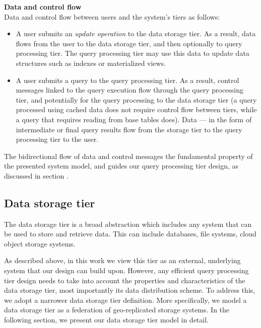 \bigskip

\noindent
\textbf{Data and control flow} \\

\noindent
Data and control flow between users and the system's tiers as follows: 
\begin{itemize}
  \item A user submits an \textit{update operation} to the data storage tier.
  As a result, data flows from the user to the data storage tier, and then optionally to query processing tier.
  The query processing tier may use this data to update data structures such as indexes or materialized views.

  \item A user submits a query to the query processing tier.
  As a result, control messages linked to the query execution flow through the query processing tier, and potentially
  for the query processing to the data storage tier (a query processed using cached data does not require control flow
  between tiers, while a query that requires reading from base tables does).
  Data --- in the form of intermediate or final query results flow from the storage tier to the query processing tier to
  the user.
\end{itemize}

The bidirectional flow of data and control messages the fundamental property of the presented system model, and guides
our query processing tier design, as discussed in section \todo{}.

\subsection{Data storage tier}

The data storage tier is a broad abstraction which includes any system that can be used to store and retrieve data.
This can include databases, file systems, cloud object storage systems.

As described above, in this work we view this tier as an external, underlying system that our design can build upon.
However, any efficient query processing tier design needs to take into account the properties and characteristics of the
data storage tier, most importantly its data distribution scheme.
To address this, we adopt a narrower data storage tier definition.
More specifically, we model a data storage tier as a federation of geo-replicated storage systems.
In the following section, we present our data storage tier model in detail.


